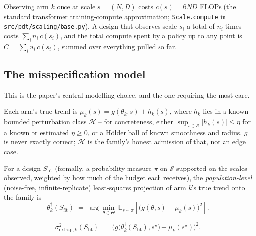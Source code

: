 \begin{assumption}
\label{asn:cost}
Observing arm $k$ once at scale $s = (N, D)$ costs $c(s) = 6 N D$ FLOPs (the standard
transformer training-compute approximation; \texttt{Scale.compute} in
\texttt{src/pdt/scaling/base.py}). A design that observes scale $s_i$ a total of $n_i$
times costs $\sum_i n_i \, c(s_i)$, and the total compute spent by a policy up to any
point is $C = \sum_i n_i \, c(s_i)$, summed over everything pulled so far.
\end{assumption}

\subsection{The misspecification model}
\label{sec:setup-misspec}

This is the paper's central modelling choice, and the one requiring the most care.

\begin{assumption}
\label{asn:misspec}
Each arm's true trend is $\mu_k(s) = g(\theta_k, s) + h_k(s)$, where $h_k$ lies in a
known bounded perturbation class $\mathcal{H}$ -- for concreteness, either
$\sup_{s \in \mathcal{S}} |h_k(s)| \le \eta$ for a known or estimated $\eta \ge 0$, or a
Hölder ball of known smoothness and radius. $g$ is never exactly correct; $\mathcal{H}$
is the family's honest admission of that, not an edge case.
\end{assumption}

\begin{definition}
\label{def:projection}
For a design $S_{\mathrm{fit}}$ (formally, a probability measure $\pi$ on
$\mathcal{S}$ supported on the scales observed, weighted by how much of the budget each
receives), the \emph{population-level} (noise-free, infinite-replicate) least-squares
projection of arm $k$'s true trend onto the family is
\[
  \theta_k^{\dagger}(S_{\mathrm{fit}})
  \;=\; \arg\min_{\theta \in \Theta} \ \mathbb{E}_{s \sim \pi}\!\left[
    \big( g(\theta, s) - \mu_k(s) \big)^2 \right].
\]
\end{definition}

\begin{definition}
\label{def:sigma2-extrap}
\[
  \sigma^2_{\mathrm{extrap}, k}(S_{\mathrm{fit}})
  \;=\; \Big( g\big(\theta_k^{\dagger}(S_{\mathrm{fit}}), s^\star\big) - \mu_k(s^\star)
  \Big)^2 .
\]
\end{definition}

